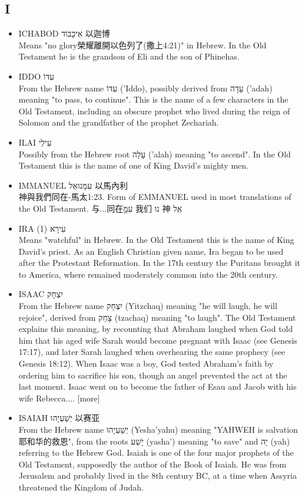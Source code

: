 \subsection{I}
\begin{itemize} 
\itemsep-.25em  
\item ICHABOD אִיכָבוֹד  以迦博\\
Means "no glory榮耀離開以色列了(撒上4:21)" in Hebrew. In the Old Testament he is the grandson of Eli and the son of Phinehas. 
\item IDDO עִדּוֹ \\
From the Hebrew name עִדּוֹ ('Iddo), possibly derived from עָדָה ('adah) meaning "to pass, to continue". This is the name of a few characters in the Old Testament, including an obscure prophet who lived during the reign of Solomon and the grandfather of the prophet Zechariah.
\item ILAI עִילַי \\
Possibly from the Hebrew root עָלָה ('alah) meaning "to ascend". In the Old Testament this is the name of one of King David's mighty men.
\item IMMANUEL עִמָּנוּאֵל 以馬內利\\
神與我們同在-馬太1:23. Form of EMMANUEL used in most translations of the Old Testament. 与...同在עִמָּ֥ 我们 נוּ  神 אֵֽל
\item IRA (1) עִירָא \\
Means "watchful" in Hebrew. In the Old Testament this is the name of King David's priest. As an English Christian given name, Ira began to be used after the Protestant Reformation. In the 17th century the Puritans brought it to America, where remained moderately common into the 20th century.
\item ISAAC יִצְחָק \\
From the Hebrew name יִצְחָק (Yitzchaq) meaning "he will laugh, he will rejoice", derived from צָחַק (tzachaq) meaning "to laugh". The Old Testament explains this meaning, by recounting that Abraham laughed when God told him that his aged wife Sarah would become pregnant with Isaac (see Genesis 17:17), and later Sarah laughed when overhearing the same prophecy (see Genesis 18:12). When Isaac was a boy, God tested Abraham's faith by ordering him to sacrifice his son, though an angel prevented the act at the last moment. Isaac went on to become the father of Esau and Jacob with his wife Rebecca.... [more]
\item ISAIAH יְשַׁעְיָהוּ 以赛亚\\
From the Hebrew name יְשַׁעְיָהוּ (Yesha'yahu) meaning "YAHWEH is salvation耶和华的救恩", from the roots יָשַׁע (yasha') meaning "to save" and יָה (yah) referring to the Hebrew God. Isaiah is one of the four major prophets of the Old Testament, supposedly the author of the Book of Isaiah. He was from Jerusalem and probably lived in the 8th century BC, at a time when Assyria threatened the Kingdom of Judah. 


\end{itemize}
